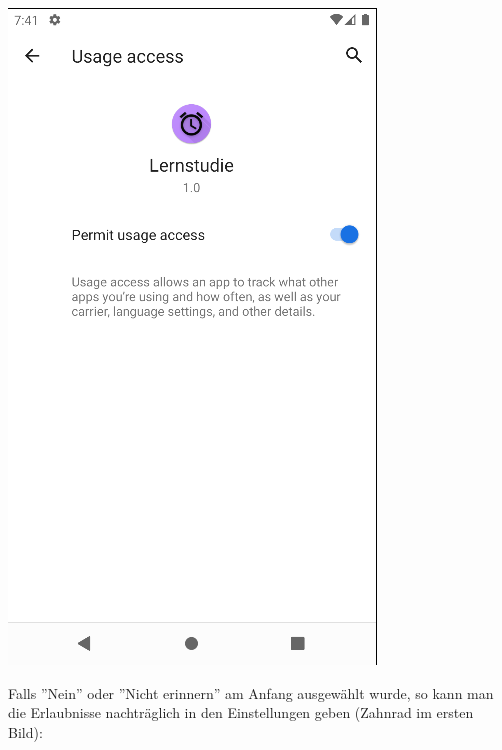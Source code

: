 \documentclass{article}
\begin{document}
\begin{center}
    \includegraphics[scale=0.4]{item_per.png}
\end{center}
Falls ''Nein'' oder ''Nicht erinnern'' am Anfang ausgewählt wurde, so kann man die Erlaubnisse nachträglich in den Einstellungen geben (Zahnrad im ersten Bild):
\end{document}
